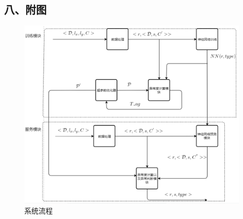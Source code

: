 \documentclass[a4paper, UTF8]{article}
\begin{document}
\begin{CJK}{UTF8}{gbsn}
\begin{appendix}
\subsection*{八、附图}
\begin{figure}[ht]
\includegraphics[scale = 0.7]{system.png}
\centering
\caption{系统流程}
\label{f-system}
\end{figure}
\end{appendix}



\end{CJK}
\end{document}

